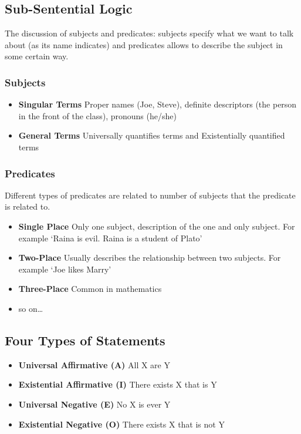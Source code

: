 \documentclass[10pt]{article}
\begin{document}
\subsection{Sub-Sentential Logic} The discussion of subjects and predicates: subjects specify what we want to talk about (as its name indicates) and predicates allows to describe the subject in some certain way. 
\subsubsection{Subjects}
\begin{itemize}
    \item \textbf{Singular Terms} Proper names (Joe, Steve), definite descriptors (the person in the front of the class), pronouns (he/she)
    \item \textbf{General Terms} Universally quantifies terms and Existentially quantified terms
\end{itemize}
\subsubsection{Predicates}
Different types of predicates are related to number of subjects that the predicate is related to. 
\begin{itemize}
    \item \textbf{Single Place} Only one subject, description of the one and only subject. For example `Raina is evil. Raina is a student of Plato'
    \item \textbf{Two-Place} Usually describes the relationship between two subjects. For example `Joe likes Marry'
    \item \textbf{Three-Place} Common in mathematics
    \item so on\dots
\end{itemize}

\subsection{Four Types of Statements}
\begin{itemize}
    \item \textbf{Universal Affirmative (A)} All X are Y
    \item \textbf{Existential Affirmative (I)} There exists X that is Y
    \item \textbf{Universal Negative (E)} No X is ever Y
    \item \textbf{Existential Negative (O)} There exists X that is not Y
\end{itemize}
\end{document}

